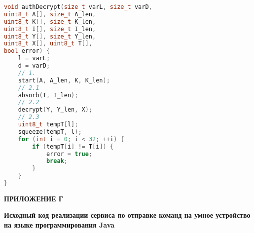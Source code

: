 \begin{lstlisting}[language=C++,label=encr-code-cpp]
void authDecrypt(size_t varL, size_t varD,
uint8_t A[], size_t A_len,
uint8_t K[], size_t K_len,
uint8_t I[], size_t I_len,
uint8_t Y[], size_t Y_len,
uint8_t X[], uint8_t T[],
bool error) {
	l = varL;
	d = varD;
	// 1.
	start(A, A_len, K, K_len);
	// 2.1
	absorb(I, I_len);
	// 2.2
	decrypt(Y, Y_len, X);
	// 2.3
	uint8_t tempT[l];
	squeeze(tempT, l);
	for (int i = 0; i < 32; ++i) {
		if (tempT[i] != T[i]) {
			error = true;
			break;
		}
	}
}

\end{lstlisting}


\newpage

\begin{flushright}{\bf \Large ПРИЛОЖЕНИЕ Г}\end{flushright}
\begin{center}
{\bf Исходный код реализации сервиса по отправке команд на умное устройство 
	на языке программирования Java}
\end{center}


